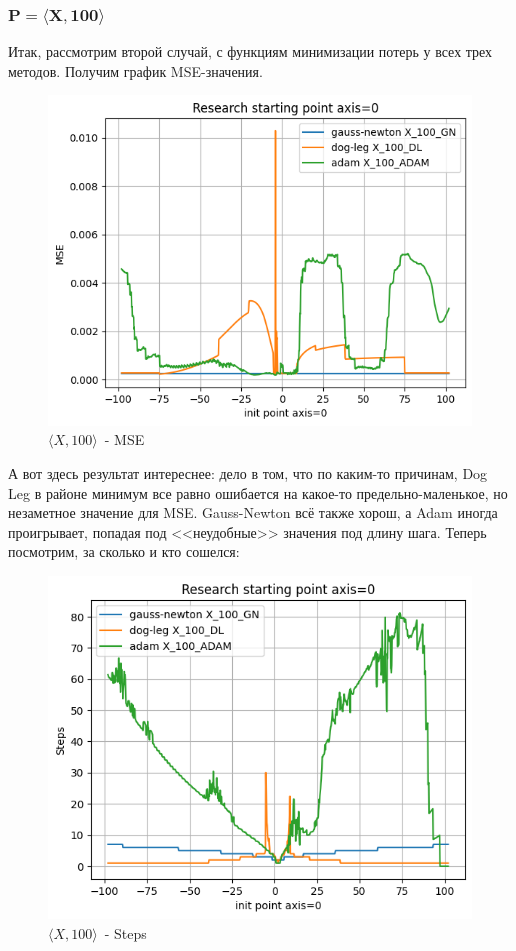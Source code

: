 \documentclass[12pt, a4paper, oneside, final]{article}
\begin{document}
	\subsubsection*{$\mathbf{P = \langle X, 100 \rangle}$}
	Итак, рассмотрим второй случай, с функциям минимизации потерь у всех трех методов.
	Получим график MSE-значения.
	\begin{figure}[H]
		\centering
		\includegraphics[scale = 0.55]{Image/T1_X_100_MSE.png}
		\caption*{$\langle X, 100 \rangle$~- MSE}
	\end{figure}
	А вот здесь результат интереснее: дело в том, что по каким-то причинам, Dog Leg в районе минимум все равно ошибается на какое-то предельно-маленькое, но незаметное значение для MSE.
	Gauss-Newton всё также хорош, а Adam иногда проигрывает, попадая под <<неудобные>> значения под длину шага.
	Теперь посмотрим, за сколько и кто сошелся:
	\begin{figure}[H]
		\centering
		\includegraphics[scale = 0.55]{Image/T1_X_100_STEPS.png}
		\caption*{$\langle X, 100 \rangle$~- Steps}
	\end{figure}
\end{document}
